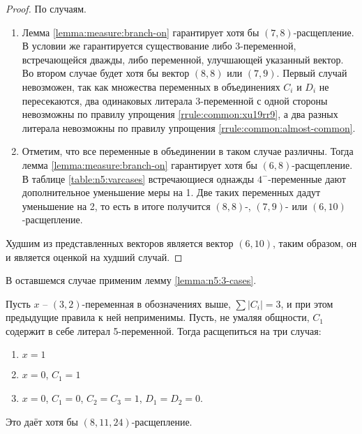 \begin{proof}
 По случаям.
 \begin{enumerate}
  \item Лемма \ref{lemma:measure:branch-on} гарантирует хотя бы $(7,8)$-расщепление. В условии же гарантируется существование либо 3-переменной, встречающейся дважды, либо переменной, улучшающей указанный вектор. Во втором случае будет хотя бы вектор $(8,8)$ или $(7,9)$. Первый случай невозможен, так как множества переменных в объединениях $C_i$ и $D_i$ не пересекаются, два одинаковых литерала 3-переменной с одной стороны невозможны по правилу упрощения \ref{rrule:common:xu19rr9}, а два разных литерала невозможны по правилу упрощения \ref{rrule:common:almost-common}.

  \item Отметим, что все переменные в объединении в таком случае различны. Тогда лемма \ref{lemma:measure:branch-on} гарантирует хотя бы $(6,8)$-расщепление. В таблице \ref{table:n5:varcases} встречающиеся однажды $4^-$-переменные дают дополнительное уменьшение меры на 1. Две таких переменных дадут уменьшение на 2, то есть в итоге получится $(8,8)$-, $(7,9)$- или $(6,10)$-расщепление.
 \end{enumerate}

 Худшим из представленных векторов является вектор $(6,10)$, таким образом, он и является оценкой на худший случай.
\end{proof}

В оставшемся случае применим лемму \ref{lemma:n5:3-cases}.

\begin{brule}
 Пусть $x$ -- $(3,2)$-переменная в обозначениях выше, $\sum |C_i| = 3$, и при этом предыдущие правила к ней неприменимы. Пусть, не умаляя общности, $C_1$ содержит в себе литерал 5-переменной. Тогда расщепиться на три случая:

 \begin{enumerate}
  \item $x = 1$
  \item $x = 0$, $C_1 = 1$
  \item $x = 0$, $C_1 = 0$, $C_2 = C_3 = 1$, $D_1 = D_2 = 0$.
 \end{enumerate}

 Это даёт хотя бы $(8,11,24)$-расщепление.
 \label{brule:n5:32-rest:c3:3-cases}
\end{brule}

